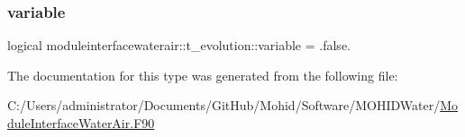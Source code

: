 \subsubsection{\texorpdfstring{variable}{variable}}
{\footnotesize\ttfamily logical moduleinterfacewaterair\+::t\+\_\+evolution\+::variable = .false.\hspace{0.3cm}{\ttfamily [private]}}



The documentation for this type was generated from the following file\+:\begin{DoxyCompactItemize}
\item 
C\+:/\+Users/administrator/\+Documents/\+Git\+Hub/\+Mohid/\+Software/\+M\+O\+H\+I\+D\+Water/\mbox{\hyperlink{_module_interface_water_air_8_f90}{Module\+Interface\+Water\+Air.\+F90}}\end{DoxyCompactItemize}
